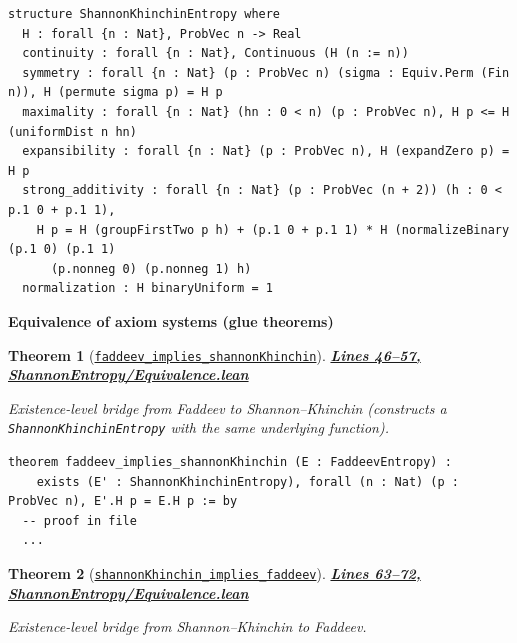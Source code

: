 \documentclass[11pt]{article}
\newtheorem{theorem}{Theorem}[section]
\theoremstyle{definition}
\theoremstyle{remark}
\begin{document}
\begin{lstlisting}[caption={Shannon--Khinchin axiom interface}]
structure ShannonKhinchinEntropy where
  H : forall {n : Nat}, ProbVec n -> Real
  continuity : forall {n : Nat}, Continuous (H (n := n))
  symmetry : forall {n : Nat} (p : ProbVec n) (sigma : Equiv.Perm (Fin n)), H (permute sigma p) = H p
  maximality : forall {n : Nat} (hn : 0 < n) (p : ProbVec n), H p <= H (uniformDist n hn)
  expansibility : forall {n : Nat} (p : ProbVec n), H (expandZero p) = H p
  strong_additivity : forall {n : Nat} (p : ProbVec (n + 2)) (h : 0 < p.1 0 + p.1 1),
    H p = H (groupFirstTwo p h) + (p.1 0 + p.1 1) * H (normalizeBinary (p.1 0) (p.1 1)
      (p.nonneg 0) (p.nonneg 1) h)
  normalization : H binaryUniform = 1
\end{lstlisting}

\textbf{Equivalence of axiom systems (glue theorems)}

\begin{theorem}[\href{https://github.com/zariuq/ks-foundations-of-inference/blob/main/InformationTheory/ShannonEntropy/Equivalence.lean\#L46}{\texttt{faddeev\_implies\_shannonKhinchin}}]
\textbf{\href{https://github.com/zariuq/ks-foundations-of-inference/blob/main/InformationTheory/ShannonEntropy/Equivalence.lean\#L46-L57}{Lines 46--57, ShannonEntropy/Equivalence.lean}}

Existence-level bridge from Faddeev to Shannon--Khinchin (constructs a \texttt{ShannonKhinchinEntropy}
with the same underlying function).
\end{theorem}

\begin{lstlisting}[caption={Faddeev -> Shannon--Khinchin bridge}]
theorem faddeev_implies_shannonKhinchin (E : FaddeevEntropy) :
    exists (E' : ShannonKhinchinEntropy), forall (n : Nat) (p : ProbVec n), E'.H p = E.H p := by
  -- proof in file
  ...
\end{lstlisting}

\begin{theorem}[\href{https://github.com/zariuq/ks-foundations-of-inference/blob/main/InformationTheory/ShannonEntropy/Equivalence.lean\#L63}{\texttt{shannonKhinchin\_implies\_faddeev}}]
\textbf{\href{https://github.com/zariuq/ks-foundations-of-inference/blob/main/InformationTheory/ShannonEntropy/Equivalence.lean\#L63-L72}{Lines 63--72, ShannonEntropy/Equivalence.lean}}

Existence-level bridge from Shannon--Khinchin to Faddeev.
\end{theorem}
\end{document}
